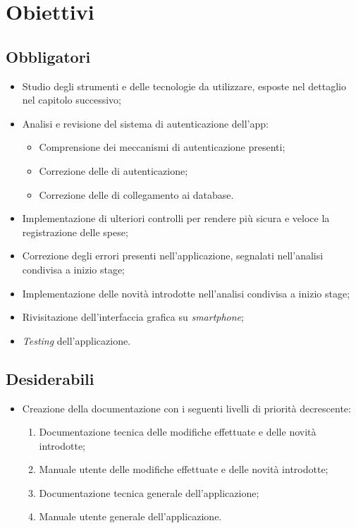 \section{Obiettivi}
\label{cap:obiettivi}
\subsection{Obbligatori}

\begin{itemize}
    \item Studio degli strumenti e delle tecnologie da utilizzare, esposte nel dettaglio nel capitolo successivo;
    \item Analisi e revisione del sistema di autenticazione dell'app:
    \begin{itemize}
        \item Comprensione dei meccanismi di autenticazione presenti;
        \item Correzione delle  di autenticazione;
        \item Correzione delle  di collegamento ai database.
    \end{itemize}
    \item Implementazione di ulteriori controlli per rendere più sicura e veloce la registrazione delle spese;
    \item Correzione degli errori presenti nell'applicazione, segnalati nell'analisi condivisa a inizio stage;
    \item Implementazione delle novità introdotte nell'analisi condivisa a inizio stage;
    \item Rivisitazione dell'interfaccia grafica su \textit{smartphone};
    \item \textit{Testing} dell'applicazione.
\end{itemize}

\subsection{Desiderabili}

\begin{itemize}
    \item Creazione della documentazione con i seguenti livelli di priorità decrescente:
    \begin{enumerate}
        \item Documentazione tecnica delle modifiche effettuate e delle novità introdotte;
        \item Manuale utente delle modifiche effettuate e delle novità introdotte;
        \item Documentazione tecnica generale dell'applicazione;
        \item Manuale utente generale dell'applicazione.
    \end{enumerate}
\end{itemize}

